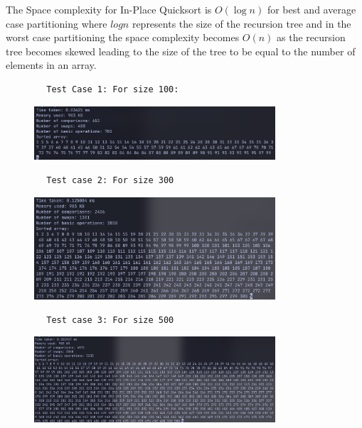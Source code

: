 \documentclass{article}
\begin{document}
\begin{enumerate}
\begin{enumerate}[label*=\arabic*.]
        The Space complexity for In-Place Quicksort is \( O(\log n) \) for best and average case partitioning where \( logn \) represents the size of the recursion tree and in the worst case partitioning the space complexity becomes \( O (n) \) as the recursion tree becomes skewed leading to the size of the tree to be equal to the number of elements in an array. 

        \begin{verbatim}
        Test Case 1: For size 100:
        \end{verbatim}

        \begin{figure}[h]
            \centering
            \includegraphics[width=0.8\textwidth]{./quicksort-tc-1.png}
            \label{fig:image1}
        \end{figure}

        \begin{verbatim}
        Test case 2: For size 300
        \end{verbatim}

        \begin{figure}[h]
            \centering
            \includegraphics[width=0.8\textwidth]{./quicksort-tc-2.png}
            \label{fig:image2}
        \end{figure}

        \begin{verbatim}
        Test case 3: For size 500
        \end{verbatim}

        \begin{figure}[h]
            \centering
            \includegraphics[width=0.8\textwidth]{./quicksort-tc-3.png}
            \label{fig:image3}
        \end{figure}


\end{enumerate}
\end{enumerate}
\end{document}
